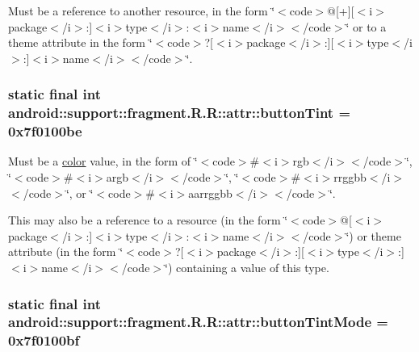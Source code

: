Must be a reference to another resource, in the form \char`\"{}$<$code$>$@\mbox{[}+\mbox{]}\mbox{[}$<$i$>$package$<$/i$>$:\mbox{]}$<$i$>$type$<$/i$>$:$<$i$>$name$<$/i$>$$<$/code$>$\char`\"{} or to a theme attribute in the form \char`\"{}$<$code$>$?\mbox{[}$<$i$>$package$<$/i$>$:\mbox{]}\mbox{[}$<$i$>$type$<$/i$>$:\mbox{]}$<$i$>$name$<$/i$>$$<$/code$>$\char`\"{}. \hypertarget{classandroid_1_1support_1_1fragment_1_1_r_1_1attr_c7a084c77b8a75c9ff41eca2c43e7bf3}{
\subsubsection[{buttonTint}]{\setlength{\rightskip}{0pt plus 5cm}static final int android::support::fragment.R.R::attr::buttonTint = 0x7f0100be}}
\label{classandroid_1_1support_1_1fragment_1_1_r_1_1attr_c7a084c77b8a75c9ff41eca2c43e7bf3}


Must be a \hyperlink{classandroid_1_1support_1_1fragment_1_1_r_1_1color}{color} value, in the form of \char`\"{}$<$code$>$\#$<$i$>$rgb$<$/i$>$$<$/code$>$\char`\"{}, \char`\"{}$<$code$>$\#$<$i$>$argb$<$/i$>$$<$/code$>$\char`\"{}, \char`\"{}$<$code$>$\#$<$i$>$rrggbb$<$/i$>$$<$/code$>$\char`\"{}, or \char`\"{}$<$code$>$\#$<$i$>$aarrggbb$<$/i$>$$<$/code$>$\char`\"{}. 

This may also be a reference to a resource (in the form \char`\"{}$<$code$>$@\mbox{[}$<$i$>$package$<$/i$>$:\mbox{]}$<$i$>$type$<$/i$>$:$<$i$>$name$<$/i$>$$<$/code$>$\char`\"{}) or theme attribute (in the form \char`\"{}$<$code$>$?\mbox{[}$<$i$>$package$<$/i$>$:\mbox{]}\mbox{[}$<$i$>$type$<$/i$>$:\mbox{]}$<$i$>$name$<$/i$>$$<$/code$>$\char`\"{}) containing a value of this type. \hypertarget{classandroid_1_1support_1_1fragment_1_1_r_1_1attr_3a35f0d337b7a4fd55cd2dd5148d2b17}{
\subsubsection[{buttonTintMode}]{\setlength{\rightskip}{0pt plus 5cm}static final int android::support::fragment.R.R::attr::buttonTintMode = 0x7f0100bf}}
\label{classandroid_1_1support_1_1fragment_1_1_r_1_1attr_3a35f0d337b7a4fd55cd2dd5148d2b17}


